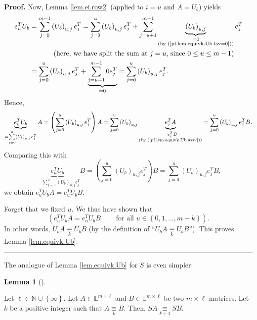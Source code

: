 \documentclass[numbers=enddot,12pt,final,onecolumn,notitlepage]{scrartcl}%
\theoremstyle{definition}
\newtheorem{lem}[theo]{Lemma}
\newenvironment{lemma}[1][]
{\begin{lem}[#1]\begin{leftbar}}
{\end{leftbar}\end{lem}}
\newenvironment{proof}[1][Proof]{\noindent\textbf{#1.} }{\ \rule{0.5em}{0.5em}}
\let\sumnonlimits\sum
\renewcommand{\sum}{\sumnonlimits\limits}
\begin{document}
\begin{proof}
Now, Lemma \ref{lem.ei.row2} (applied to $i=u$ and $A=U_{b}$) yields%
\begin{align*}
e_{u}^{T}U_{b}  &  =\sum_{j=0}^{m-1}\left(  U_{b}\right)  _{u,j}e_{j}^{T}%
=\sum_{j=0}^{u}\left(  U_{b}\right)  _{u,j}e_{j}^{T}+\sum_{j=u+1}%
^{m-1}\underbrace{\left(  U_{b}\right)  _{u,j}}_{\substack{=0\\\text{(by
(\ref{pf.lem.equivk.Ub.lav=0}))}}}e_{j}^{T}\\
&  \ \ \ \ \ \ \ \ \ \ \left(  \text{here, we have split the sum at
}j=u\text{, since }0\leq u\leq m-1\right) \\
&  =\sum_{j=0}^{u}\left(  U_{b}\right)  _{u,j}e_{j}^{T}+\underbrace{\sum
_{j=u+1}^{m-1}0e_{j}^{T}}_{=0}=\sum_{j=0}^{u}\left(  U_{b}\right)  _{u,j}%
e_{j}^{T}.
\end{align*}
Hence,%
\[
\underbrace{e_{u}^{T}U_{b}}_{=\sum_{j=0}^{u}\left(  U_{b}\right)  _{u,j}%
e_{j}^{T}}A=\left(  \sum_{j=0}^{u}\left(  U_{b}\right)  _{u,j}e_{j}%
^{T}\right)  A=\sum_{j=0}^{u}\left(  U_{b}\right)  _{u,j}\underbrace{e_{j}%
^{T}A}_{\substack{=e_{j}^{T}B\\\text{(by (\ref{pf.lem.equivk.Ub.assv}))}%
}}=\sum_{j=0}^{u}\left(  U_{b}\right)  _{u,j}e_{j}^{T}B.
\]
Comparing this with%
\[
\underbrace{e_{u}^{T}U_{b}}_{=\sum_{j=0}^{u}\left(  U_{b}\right)  _{u,j}%
e_{j}^{T}}B=\left(  \sum_{j=0}^{u}\left(  U_{b}\right)  _{u,j}e_{j}%
^{T}\right)  B=\sum_{j=0}^{u}\left(  U_{b}\right)  _{u,j}e_{j}^{T}B,
\]
we obtain $e_{u}^{T}U_{b}A=e_{u}^{T}U_{b}B$.

Forget that we fixed $u$. We thus have shown that%
\[
\left(  e_{u}^{T}U_{b}A=e_{u}^{T}U_{b}B\ \ \ \ \ \ \ \ \ \ \text{for all }%
u\in\left\{  0,1,\ldots,m-k\right\}  \right)  .
\]
In other words, $U_{b}A\underset{k}{\equiv}U_{b}B$ (by the definition of
\textquotedblleft$U_{b}A\underset{k}{\equiv}U_{b}B$\textquotedblright). This
proves Lemma \ref{lem.equivk.Ub}.
\end{proof}

The analogue of Lemma \ref{lem.equivk.Ub} for $S$ is even simpler:

\begin{lemma}
\label{lem.equivk.S}Let $\ell\in\mathbb{N}\cup\left\{  \infty\right\}  $. Let
$A\in\mathbb{L}^{m\times\ell}$ and $B\in\mathbb{L}^{m\times\ell}$ be two
$m\times\ell$-matrices. Let $k$ be a positive integer such that
$A\underset{k}{\equiv}B$. Then, $SA\underset{k+1}{\equiv}SB$.
\end{lemma}
\end{document}
